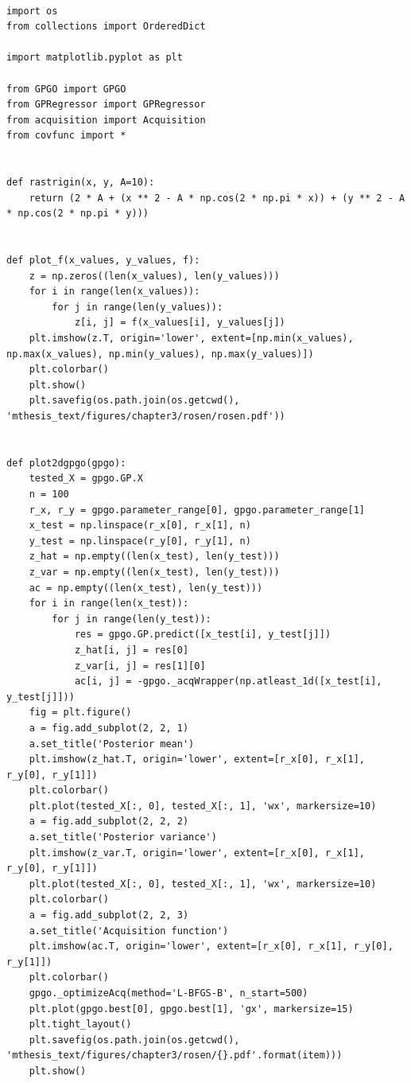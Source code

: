 \documentclass[10pt,a4paper,twoside]{book}
\begin{document}
\begin{verbatim}
               
import os
from collections import OrderedDict

import matplotlib.pyplot as plt

from GPGO import GPGO
from GPRegressor import GPRegressor
from acquisition import Acquisition
from covfunc import *


def rastrigin(x, y, A=10):
    return (2 * A + (x ** 2 - A * np.cos(2 * np.pi * x)) + (y ** 2 - A * np.cos(2 * np.pi * y)))


def plot_f(x_values, y_values, f):
    z = np.zeros((len(x_values), len(y_values)))
    for i in range(len(x_values)):
        for j in range(len(y_values)):
            z[i, j] = f(x_values[i], y_values[j])
    plt.imshow(z.T, origin='lower', extent=[np.min(x_values), np.max(x_values), np.min(y_values), np.max(y_values)])
    plt.colorbar()
    plt.show()
    plt.savefig(os.path.join(os.getcwd(), 'mthesis_text/figures/chapter3/rosen/rosen.pdf'))


def plot2dgpgo(gpgo):
    tested_X = gpgo.GP.X
    n = 100
    r_x, r_y = gpgo.parameter_range[0], gpgo.parameter_range[1]
    x_test = np.linspace(r_x[0], r_x[1], n)
    y_test = np.linspace(r_y[0], r_y[1], n)
    z_hat = np.empty((len(x_test), len(y_test)))
    z_var = np.empty((len(x_test), len(y_test)))
    ac = np.empty((len(x_test), len(y_test)))
    for i in range(len(x_test)):
        for j in range(len(y_test)):
            res = gpgo.GP.predict([x_test[i], y_test[j]])
            z_hat[i, j] = res[0]
            z_var[i, j] = res[1][0]
            ac[i, j] = -gpgo._acqWrapper(np.atleast_1d([x_test[i], y_test[j]]))
    fig = plt.figure()
    a = fig.add_subplot(2, 2, 1)
    a.set_title('Posterior mean')
    plt.imshow(z_hat.T, origin='lower', extent=[r_x[0], r_x[1], r_y[0], r_y[1]])
    plt.colorbar()
    plt.plot(tested_X[:, 0], tested_X[:, 1], 'wx', markersize=10)
    a = fig.add_subplot(2, 2, 2)
    a.set_title('Posterior variance')
    plt.imshow(z_var.T, origin='lower', extent=[r_x[0], r_x[1], r_y[0], r_y[1]])
    plt.plot(tested_X[:, 0], tested_X[:, 1], 'wx', markersize=10)
    plt.colorbar()
    a = fig.add_subplot(2, 2, 3)
    a.set_title('Acquisition function')
    plt.imshow(ac.T, origin='lower', extent=[r_x[0], r_x[1], r_y[0], r_y[1]])
    plt.colorbar()
    gpgo._optimizeAcq(method='L-BFGS-B', n_start=500)
    plt.plot(gpgo.best[0], gpgo.best[1], 'gx', markersize=15)
    plt.tight_layout()
    plt.savefig(os.path.join(os.getcwd(), 'mthesis_text/figures/chapter3/rosen/{}.pdf'.format(item)))
    plt.show()



\end{verbatim}
\end{document}
